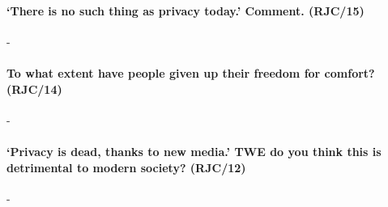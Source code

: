 \documentclass[../../main]{subfiles}
\begin{document}
\paragraph{`There is no such thing as privacy today.' Comment. (RJC/15)}-

\paragraph{To what extent have people given up their freedom for comfort? (RJC/14)}-

\paragraph{`Privacy is dead, thanks to new media.' TWE do you think this is detrimental to modern society? (RJC/12)}-
\end{document}
